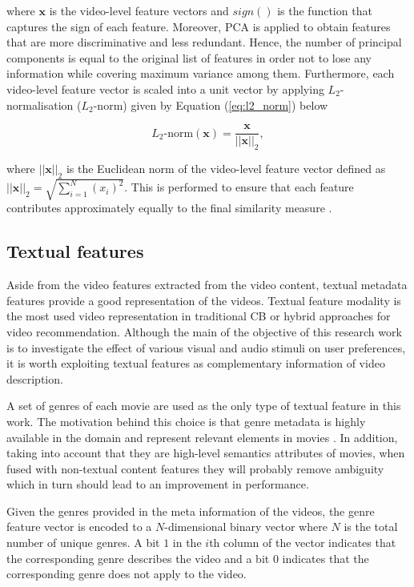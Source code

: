 \documentclass[review]{elsarticle}
\begin{document}
\noindent where $\mathbf{x}$ is the video-level feature vectors and $sign()$ is the function that captures the sign of each feature. Moreover, \ac{PCA} is applied to obtain features that are more discriminative and less redundant. Hence, the number of principal components is equal to the original list of features in order not to lose any information while covering maximum variance among them. Furthermore, each video-level feature vector is scaled into a unit vector by applying $L_2$-normalisation ($L_2$-norm) given by Equation (\ref{eq:l2_norm}) below  

\begin{equation}
 L_2\mbox{-norm}(\mathbf{x}) = \frac{\mathbf{x}}{||\mathbf{x}||_2},
 \label{eq:l2_norm}
\end{equation}

\noindent where $||\mathbf{x}||_2$ is the Euclidean norm of the video-level feature vector defined as $||\mathbf{x}||_2 = \sqrt{\sum_{i=1}^{N}(x_i)^2}$. This is performed to ensure that each feature contributes approximately equally to the final similarity measure \citep{ranjan2017l2}. 

\subsection{Textual features}
Aside from the video features extracted from the video content, textual metadata features provide a good representation of the videos. Textual feature modality is the most used video representation in traditional \ac{CB} or hybrid approaches for video recommendation. Although the main of the objective of this research work is to investigate the effect of various visual and audio stimuli on user preferences, it is worth exploiting textual features as complementary information of video description. 

A set of genres of each movie are used as the only type of textual feature in this work. The motivation behind this choice is that genre metadata is highly available in the domain and represent relevant elements in movies \citep{deldjoo2019movie}. In addition, taking into account that they are high-level semantics attributes of movies, when fused with non-textual content features they will probably remove ambiguity which in turn should lead to an improvement in performance. 

Given the genres provided in the meta information of the videos, the genre feature vector is encoded to a $N$-dimensional binary vector where $N$ is the total number of unique genres. A bit $1$ in the $i$th column of the vector indicates that the corresponding genre describes the video and a bit $0$ indicates that the corresponding genre does not apply to the video. 
\end{document}
